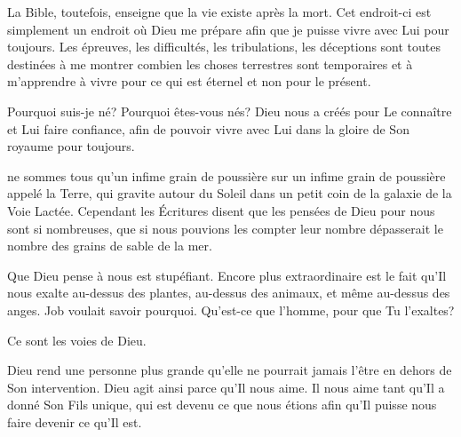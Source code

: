 La Bible, toutefois, enseigne que la vie existe après la mort.
 Cet endroit-ci est simplement un endroit où Dieu me prépare
 afin que je puisse vivre avec Lui pour toujours.
 Les épreuves, les difficultés, les tribulations,
 les déceptions sont toutes destinées à me montrer
 combien les choses terrestres sont temporaires
 et à m'apprendre à vivre pour ce qui est éternel et non pour le présent.

Pourquoi suis-je né? Pourquoi êtes-vous nés?
 Dieu nous a créés pour Le connaître et Lui faire confiance,
 afin de pouvoir vivre avec Lui dans la gloire de Son royaume pour toujours. 

\dvrule







 ne sommes tous qu'un infime grain de poussière
 sur un infime grain de poussière appelé la Terre,
 qui gravite autour du Soleil dans un petit coin de la galaxie
 de la Voie Lactée.
 Cependant les Écritures disent que les pensées de Dieu pour nous
 sont si nombreuses, que si nous pouvions les compter
 leur nombre dépasserait le nombre des grains de sable de la mer.

Que Dieu pense à nous est stupéfiant. Encore plus extraordinaire
 est le fait qu'Il nous exalte \ocadr{}au-dessus des plantes,
 au-dessus des animaux, et même au-dessus des anges.
 Job voulait savoir pourquoi.
 \og Qu'est-ce que l'homme, pour que Tu l'exaltes? \fg{}

Ce sont les voies de Dieu.


Dieu rend une personne plus grande qu'elle ne pourrait jamais l'être
 en dehors de Son intervention.
 Dieu agit ainsi parce qu'Il nous aime.
 Il nous aime tant qu'Il a donné Son Fils unique,
 qui est devenu ce que nous étions afin qu'Il puisse
 nous faire devenir ce qu'Il est.

